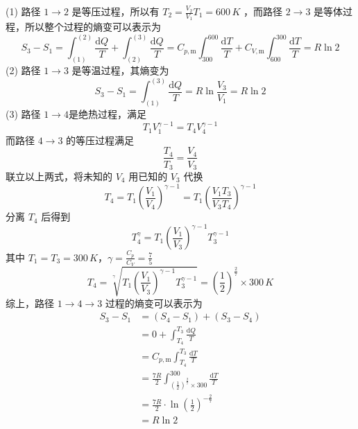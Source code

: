 \begin{solution}
    (1) 路径 $1 \to 2$ 是等压过程，所以有 $T_2 = \frac{V_2}{V_1}T_1 = 600 \,\si{K}$ ，而路径 $2 \to 3$ 是等体过程，所以整个过程的熵变可以表示为
    $$
        S_3 - S_1
        = \int_{(1)}^{(2)} \frac{\mathrm{d}Q}{T} + \int_{(2)}^{(3)} \frac{\mathrm{d}Q}{T}
        = C_{p,\mathrm{m}}\int_{300}^{600}\frac{\mathrm{d}T}{T} + C_{V,\mathrm{m}}\int_{600}^{300}\frac{\mathrm{d}T}{T}
        = R\ln2
    $$
    (2) 路径 $1 \to 3$ 是等温过程，其熵变为
    $$
        S_3 - S_1 = \int_{(1)}^{(3)} \frac{\mathrm{d}Q}{T} = R\ln\frac{V_3}{V_1} = R\ln2
    $$
    (3) 路径 $1 \to 4$是绝热过程，满足
    $$
        T_1V_1^{\gamma-1} = T_4V_4^{\gamma-1}
    $$
    而路径 $4 \to 3$ 的等压过程满足
    $$
        \frac{T_4}{T_3} = \frac{V_4}{V_3}
    $$
    联立以上两式，将未知的 $V_4$ 用已知的 $V_3$ 代换
    $$
        T_4 = T_1 \left(\frac{V_1}{V_4}\right)^{\gamma-1}
        = T_1 \left(\frac{V_1T_3}{V_3T_4}\right)^{\gamma-1}
    $$
    分离 $T_4$ 后得到
    $$
        T_4^{\gamma} = T_1\left(\frac{V_1}{V_3}\right)^{\gamma-1}T_3^{\gamma-1}
    $$
    其中 $T_1 = T_3 = 300 \,\si{K}$，$\gamma = \frac{C_p}{C_V} = \frac{7}{5}$
    $$
        T_4
        = \sqrt[\gamma]{T_1\left(\frac{V_1}{V_3}\right)^{\gamma-1}T_3^{\gamma-1}}
        = \left(\frac{1}{2}\right)^{\frac{2}{7}} \times 300 \,\si{K}
    $$
    综上，路径 $1 \to 4 \to 3$ 过程的熵变可以表示为
    $$
        \begin{aligned}
            S_3 - S_1
             & = (S_4 - S_1) + (S_3-S_4)                                                                          \\
             & = 0 + \int_{T_4}^{T_3} \frac{\mathrm{d}Q}{T}                                                       \\
             & = C_{p,\mathrm{m}}\int_{T_4}^{T_3} \frac{\mathrm{d}T}{T}                                           \\
             & = \frac{7R}{2}\int_{\left(\frac{1}{2}\right)^{\frac{2}{7}} \times 300}^{300} \frac{\mathrm{d}T}{T} \\
             & = \frac{7R}{2} \cdot \ln\left(\frac{1}{2}\right)^{-\frac{2}{7}}                                    \\
             & = R \ln2
        \end{aligned}
    $$

\end{solution}

